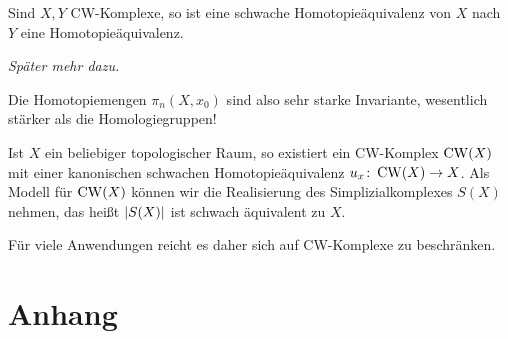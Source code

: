 \begin{satz}[name={Whitehead}]
	Sind $X,Y$ CW-Komplexe, so ist eine schwache Homotopieäquivalenz von $X$ nach $Y$ eine Homotopieäquivalenz.
\end{satz}
\begin{beweis}
	\emph{Später mehr dazu.}
\end{beweis}

\begin{bemerkung}[{name=[Homotopiemengen als Invariante]}]
	Die Homotopiemengen $\pi_n(X,x_0)$ sind also sehr starke Invariante, wesentlich stärker als die Homologiegruppen!
\end{bemerkung}

\begin{bemerkung}[{name=[CW-Approximation]}]
	Ist $X$ ein beliebiger topologischer Raum, so existiert ein CW-Komplex $\CW(X)$ mit einer kanonischen schwachen Homotopieäquivalenz $u_x \colon \CW(X) \to X$.
	Als Modell für $\CW(X)$ können wir die Realisierung des Simplizialkomplexes $S(X)$ nehmen, das heißt $\abs*{S(X)}$ ist schwach äquivalent zu $X$.
\end{bemerkung}

\begin{bemerkung}[{name=[Beschränkung auf CW-Komplexe]}]
	Für viele Anwendungen reicht es daher sich auf CW-Komplexe zu beschränken.
\end{bemerkung}


\cleardoubleoddemptypage
{}
\setcounter{page}{1}
\cleardoubleoddemptypage
\appendix

\section{Anhang} %
\label{sec:anhang}

\printindex
\printbibliography
\listoffigures
\todototoc
{}

